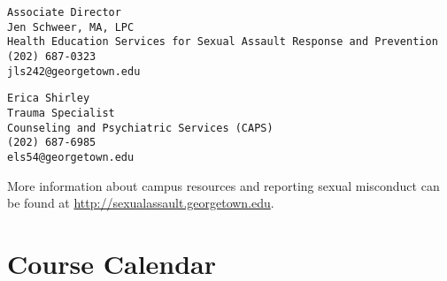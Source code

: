 \documentclass[
  12pt,
]{article}
\begin{document}
\begin{verbatim}
Associate Director
Jen Schweer, MA, LPC
Health Education Services for Sexual Assault Response and Prevention 
(202) 687-0323
jls242@georgetown.edu
\end{verbatim}

\begin{verbatim}
Erica Shirley
Trauma Specialist
Counseling and Psychiatric Services (CAPS) 
(202) 687-6985
els54@georgetown.edu
\end{verbatim}

More information about campus resources and reporting sexual misconduct
can be found at \url{http://sexualassault.georgetown.edu}.

\hypertarget{course-calendar}{%
\section{Course Calendar}\label{course-calendar}}

\begingroup\fontsize{12}{14}\selectfont
\end{document}
